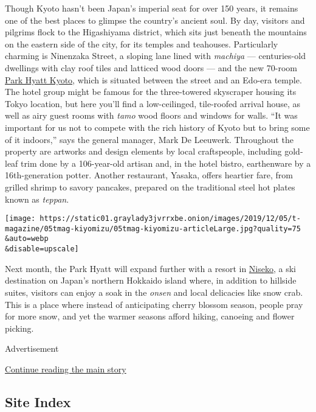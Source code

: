 Though Kyoto hasn't been Japan's imperial seat for over 150 years, it
remains one of the best places to glimpse the country's ancient soul. By
day, visitors and pilgrims flock to the Higashiyama district, which sits
just beneath the mountains on the eastern side of the city, for its
temples and teahouses. Particularly charming is Ninenzaka Street, a
sloping lane lined with \emph{machiya} --- centuries-old dwellings with
clay roof tiles and latticed wood doors --- and the new 70-room
\href{https://www.hyatt.com/en-US/hotel/japan/park-hyatt-kyoto/itmph}{Park
Hyatt Kyoto}, which is situated between the street and an Edo-era
temple. The hotel group might be famous for the three-towered skyscraper
housing its Tokyo location, but here you'll find a low-ceilinged,
tile-roofed arrival house, as well as airy guest rooms with \emph{tamo}
wood floors and windows for walls. ``It was important for us not to
compete with the rich history of Kyoto but to bring some of it
indoors,'' says the general manager, Mark De Leeuwerk. Throughout the
property are artworks and design elements by local craftspeople,
including gold-leaf trim done by a 106-year-old artisan and, in the
hotel bistro, earthenware by a 16th-generation potter. Another
restaurant, Yasaka, offers heartier fare, from grilled shrimp to savory
pancakes, prepared on the traditional steel hot plates known as
\emph{teppan}.

\texttt{[image: https://static01.graylady3jvrrxbe.onion/images/2019/12/05/t-magazine/05tmag-kiyomizu/05tmag-kiyomizu-articleLarge.jpg?quality=75\\\&auto=webp\\\&disable=upscale]}

Next month, the Park Hyatt will expand further with a resort in
\href{https://www.nytimes3xbfgragh.onion/2012/01/15/travel/niseko-japans-own-st-moritz.html}{Niseko},
a ski destination on Japan's northern Hokkaido island where, in addition
to hillside suites, visitors can enjoy a soak in the \emph{onsen} and
local delicacies like snow crab. This is a place where instead of
anticipating cherry blossom season, people pray for more snow, and yet
the warmer seasons afford hiking, canoeing and flower picking.

Advertisement

\protect\hyperlink{after-bottom}{Continue reading the main story}

\hypertarget{site-index}{%
\subsection{Site Index}\label{site-index}}


